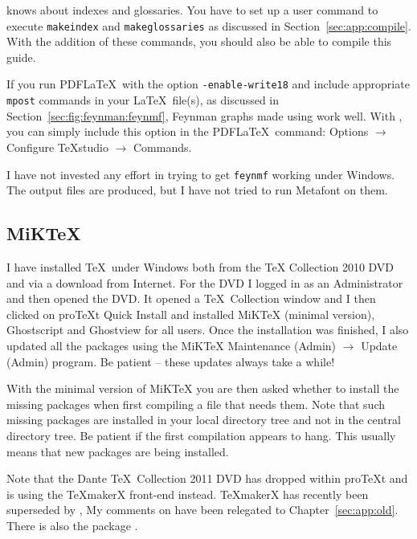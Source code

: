 \TeXstudio knows about indexes and glossaries. You have to set up a
user command to execute \texttt{makeindex} and \texttt{makeglossaries}
as discussed in Section~\ref{sec:app:compile}. With the addition of
these commands, you should also be able to compile this guide.

If you run PDF\LaTeX\ with the option \texttt{-enable-write18} and
include appropriate \texttt{mpost} commands in your \LaTeX\ file(s), as
discussed in Section~\ref{sec:fig:feynman:feynmf}, Feynman graphs made
using  work well. With \TeXstudio, you can simply
include this option in the PDF\LaTeX\ command: \textsf{Options} $\to$
\textsf{Configure TeXstudio} $\to$ \textsf{Commands}.

I have not invested any effort in trying to get \texttt{feynmf}
working under Windows. The output files are produced, but I have not
tried to run Metafont on them.


\subsection{MiK\TeX}
\label{sec:app:miktex}

I have installed \TeX\ under Windows both from the \TeX{} Collection
2010 DVD and via a download from Internet. For the DVD I logged in as
an Administrator and then opened the DVD. It opened a \TeX\ Collection
window and I then clicked on pro\TeX t Quick Install and installed
MiK\TeX{} (minimal version),
Ghostscript and Ghostview for all
users. Once the installation was finished, I also updated all the
packages using the MiK\TeX{} Maintenance (Admin) $\to$ Update (Admin)
program. Be patient -- these updates always take a while!

With the minimal version of MiK\TeX{} you are then asked whether to
install the missing packages when first compiling a file that needs
them. Note that such missing packages are installed in your local
directory tree and not in the central directory tree. Be patient if
the first compilation appears to hang. This usually means that new
packages are being installed.

Note that the Dante \TeX\ Collection 2011 DVD has dropped
\TeXnicCenter within pro\TeX t and is using the \TeX makerX front-end
instead. \TeX makerX has recently been superseded by \TeXstudio, My
comments on \TeXnicCenter have been relegated to
Chapter~\ref{sec:app:old}. There is also the package \TeXmaker.


